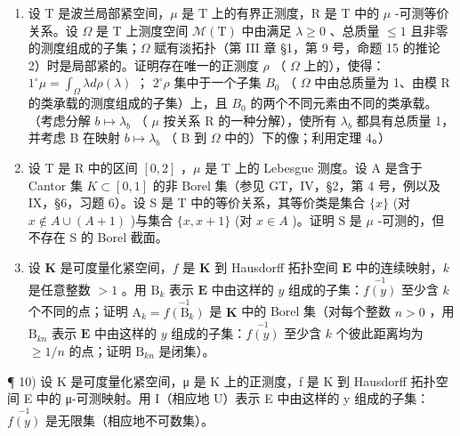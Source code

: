 \begin{enumerate}
\item
  设 T 是波兰局部紧空间，\(\mu\) 是 T 上的有界正测度，R 是 T 中的 \(\mu\) -可测等价关系。设 \(\Omega\) 是 T 上测度空间 \(\mathcal{M}(\mathrm{T})\) 中由满足 \(\lambda \geqslant 0\) 、总质量 \(\leqslant 1\) 且非零的测度组成的子集；\(\Omega\) 赋有淡拓扑（第 III 章 §1，第 9 号，命题 15 的推论 2）时是局部紧的。证明存在唯一的正测度 \(\rho\) （ \(\Omega\) 上的），使得： \(1^{\circ} \mu = \int_{\Omega} \lambda d\rho(\lambda)\) ； \(2^{\circ} \rho\) 集中于一个子集 \(B_{0}\) （ \(\Omega\) 中由总质量为 1、由模 R 的类承载的测度组成的子集）上，且 \(B_{0}\) 的两个不同元素由不同的类承载。（考虑分解 \(b \mapsto \lambda_{b}\) （ \(\mu\) 按关系 R 的一种分解），使所有 \(\lambda_{b}\) 都具有总质量 1，并考虑 B 在映射 \(b \mapsto \lambda_{b}\) （ B 到 \(\Omega\) 中的）下的像；利用定理 4。）
\item
  设 T 是 R 中的区间 \([0,2]\) ，\(\mu\) 是 T 上的 Lebesgue 测度。设 A 是含于 Cantor 集 \(K \subset [0,1]\) 的非 Borel 集（参见 GT，IV，§2，第 4 号，例以及 IX，§6，习题 6）。设 S 是 T 中的等价关系，其等价类是集合 \(\{x\}\) (对 \(x \notin A \cup (A + 1)\) )与集合 \(\{x, x + 1\}\) (对 \(x \in A\) )。证明 S 是 \(\mu\) -可测的，但不存在 S 的 Borel 截面。
\item
  设 \(\mathbf{K}\) 是可度量化紧空间，\(f\) 是 \(\mathbf{K}\) 到 Hausdorff 拓扑空间 \(\mathbf{E}\) 中的连续映射，\(k\) 是任意整数 \(> 1\) 。用 \(\mathrm{B}_k\) 表示 \(\mathbf{E}\) 中由这样的 \(y\) 组成的子集：\(\stackrel{-1}{f(y)}\) 至少含 \(k\) 个不同的点；证明 \(\mathrm{A}_k = \stackrel{-1}{f(\mathrm{B}_k)}\) 是 \(\mathbf{K}\) 中的 Borel 集（对每个整数 \(n > 0\) ，用 \(\mathrm{B}_{kn}\) 表示 \(\mathbf{E}\) 中由这样的 \(y\) 组成的子集：\(\stackrel{-1}{f(y)}\) 至少含 \(k\) 个彼此距离均为 \(\geqslant 1/n\) 的点；证明 \(\mathrm{B}_{kn}\) 是闭集）。
\end{enumerate}

¶ 10) 设 K 是可度量化紧空间，μ 是 K 上的正测度，f 是 K 到 Hausdorff 拓扑空间 E 中的 μ-可测映射。用 I（相应地 U）表示 E 中由这样的 y 组成的子集：\(\stackrel{-1}{f(y)}\) 是无限集（相应地不可数集）。

